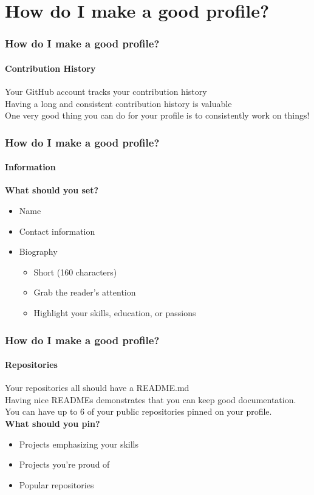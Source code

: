 \documentclass{beamer}
\begin{document}
\section{How do I make a good profile?}
\begin{frame}
  \frametitle{How do I make a good profile?}
  \framesubtitle{Contribution History}
  Your GitHub account tracks your contribution history\\\pause\vspace{0.25em}
  Having a long and consistent contribution history is valuable\\\pause\vspace{0.25em}
  One very good thing you can do for your profile is to consistently work on things!
\end{frame}

\begin{frame}
  \frametitle{How do I make a good profile?}
  \framesubtitle{Information}
  \textbf{What should you set?}\pause
  \begin{itemize}[<+->]
    \item Name
    \item Contact information
    \item Biography
    \begin{itemize}
      \item Short (160 characters)
      \item Grab the reader's attention
      \item Highlight your skills, education, or passions
    \end{itemize}
  \end{itemize}
\end{frame}

\begin{frame}
  \frametitle{How do I make a good profile?}
  \framesubtitle{Repositories}
  Your repositories all should have a README.md\\\vspace{0.25em}
  Having nice READMEs demonstrates that you can keep good documentation.\\\pause\vspace{0.25em}
  You can have up to 6 of your public repositories pinned on your profile.\pause\\
  \textbf{What should you pin?}
  \begin{itemize}[<+->]
    \item Projects emphasizing your skills
    \item Projects you're proud of
    \item Popular repositories
  \end{itemize}
\end{frame}
\end{document}
